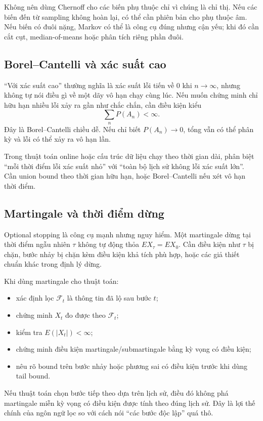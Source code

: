 \documentclass[11pt]{article}
\begin{document}
Không nên dùng Chernoff cho các biến phụ thuộc chỉ vì chúng là chỉ thị. Nếu các
biến đến từ sampling không hoàn lại, có thể cần phiên bản cho phụ thuộc âm. Nếu
biến có đuôi nặng, Markov có thể là công cụ đúng nhưng cận yếu; khi đó cần cắt
cụt, median-of-means hoặc phân tích riêng phần đuôi.

\subsection{Borel--Cantelli và xác suất cao}

``Với xác suất cao'' thường nghĩa là xác suất lỗi tiến về 0 khi \(n\to\infty\),
nhưng không tự nói điều gì về một dãy vô hạn chạy cùng lúc. Nếu muốn chứng minh
chỉ hữu hạn nhiều lỗi xảy ra gần như chắc chắn, cần điều kiện kiểu
\[
  \sum_n P(A_n)<\infty.
\]
Đây là Borel--Cantelli chiều dễ. Nếu chỉ biết \(P(A_n)\to0\), tổng vẫn có thể
phân kỳ và lỗi có thể xảy ra vô hạn lần.

Trong thuật toán online hoặc cấu trúc dữ liệu chạy theo thời gian dài, phân biệt
``mỗi thời điểm lỗi xác suất nhỏ'' với ``toàn bộ lịch sử không lỗi xác suất
lớn''. Cần union bound theo thời gian hữu hạn, hoặc Borel--Cantelli nếu xét vô
hạn thời điểm.

\subsection{Martingale và thời điểm dừng}

Optional stopping là công cụ mạnh nhưng nguy hiểm. Một martingale dừng tại thời
điểm ngẫu nhiên \(\tau\) không tự động thỏa \(E X_\tau=E X_0\). Cần điều kiện
như \(\tau\) bị chặn, bước nhảy bị chặn kèm điều kiện khả tích phù hợp, hoặc
các giả thiết chuẩn khác trong định lý dừng.

Khi dùng martingale cho thuật toán:
\begin{itemize}
  \item xác định lọc \(\mathcal{F}_t\) là thông tin đã lộ sau bước \(t\);
  \item chứng minh \(X_t\) đo được theo \(\mathcal{F}_t\);
  \item kiểm tra \(E(|X_t|)<\infty\);
  \item chứng minh điều kiện martingale/submartingale bằng kỳ vọng có điều kiện;
  \item nêu rõ bound trên bước nhảy hoặc phương sai có điều kiện trước khi dùng
        tail bound.
\end{itemize}

Nếu thuật toán chọn bước tiếp theo dựa trên lịch sử, điều đó không phá martingale
miễn kỳ vọng có điều kiện được tính theo đúng lịch sử. Đây là lợi thế chính của
ngôn ngữ lọc so với cách nói ``các bước độc lập'' quá thô.
\end{document}
